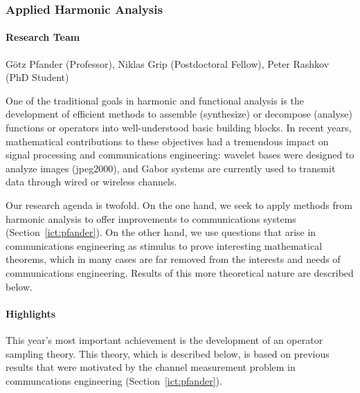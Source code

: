 \subsubsection{Applied Harmonic Analysis}\label{mps:pfander}

\paragraph{Research Team}
G\"otz Pfander (Professor), Niklas Grip (Postdoctoral Fellow), Peter Rashkov (PhD Student)

\medskip

One of the traditional goals in harmonic and functional analysis
is the development of efficient methods to assemble (synthesize)
or decompose (analyse) functions or operators into
well-understood basic building blocks. In recent years,
mathematical contributions to these objectives had a tremendous
impact on signal processing and communications engineering:
wavelet bases were designed to analyze images (jpeg2000), and
Gabor systems are currently used to transmit data through wired or
wireless channels.

Our research agenda is twofold. On the one hand, we seek to apply
methods from harmonic analysis to offer improvements to
communications systems (Section~\ref{ict:pfander}). On the other
hand, we use questions that arise in communications engineering as
stimulus to prove interesting mathematical theorems, which in many
cases are far removed from the interests and needs of
communications engineering. Results of this more theoretical
nature are described below.





\paragraph{Highlights}
This year's most important achievement  is the development of an
operator sampling theory. This theory, which is described below, is
based on previous results that were motivated by the channel
measurement problem in communcations engineering
\cite{KP06,PW06,PW06b} (Section~\ref{ict:pfander}).



\smallskip

